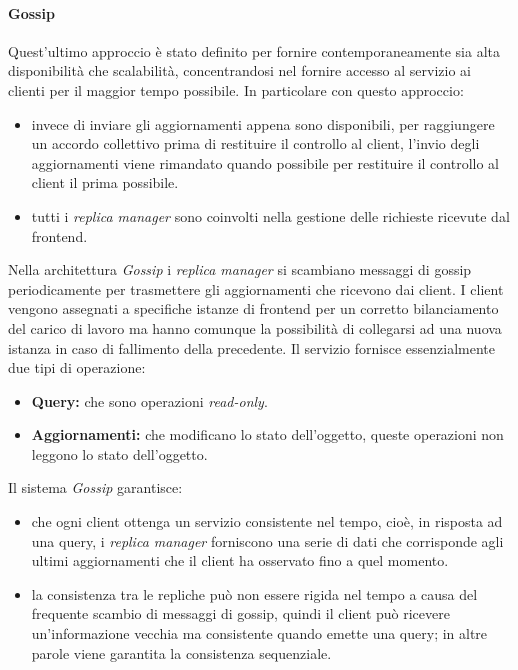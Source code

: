 \documentclass{article}
\begin{document}
\paragraph{Gossip}
Quest'ultimo approccio è stato definito per fornire contemporaneamente sia alta disponibilità che scalabilità, concentrandosi nel fornire accesso al servizio ai clienti per il maggior tempo possibile. In particolare con questo approccio:
\begin{itemize}
    \item invece di inviare gli aggiornamenti appena sono disponibili, per raggiungere un accordo collettivo prima di restituire il controllo al client, l'invio degli aggiornamenti viene rimandato quando possibile per restituire il controllo al client il prima possibile.
    \item tutti i \textit{replica manager} sono coinvolti nella gestione delle richieste ricevute dal frontend.
\end{itemize}
Nella architettura \textit{Gossip} i \textit{replica manager} si scambiano messaggi di gossip periodicamente per trasmettere gli aggiornamenti che ricevono dai client. I client vengono assegnati a specifiche istanze di frontend per un corretto bilanciamento del carico di lavoro ma hanno comunque la possibilità di collegarsi ad una nuova istanza in caso di fallimento della precedente.
Il servizio fornisce essenzialmente due tipi di operazione:
\begin{itemize}
    \item \textbf{Query:} che sono operazioni \textit{read-only}.
    \item \textbf{Aggiornamenti:} che modificano lo stato dell'oggetto, queste operazioni non leggono lo stato dell'oggetto.
\end{itemize}
Il sistema \textit{Gossip} garantisce:
\begin{itemize}
    \item che ogni client ottenga un servizio consistente nel tempo, cioè, in risposta ad una query, i \textit{replica manager} forniscono una serie di dati che corrisponde agli ultimi aggiornamenti che il client ha osservato fino a quel momento.
    \item la consistenza tra le repliche può non essere rigida nel tempo a causa del frequente scambio di messaggi di gossip, quindi il client può ricevere un'informazione vecchia ma consistente quando emette una query; in altre parole viene garantita la consistenza sequenziale.
\end{itemize}
\end{document}

